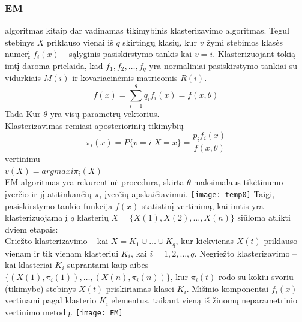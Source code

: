 \documentclass{VUMIFInfKursinis}
\begin{document}
\subsubsection{EM}
 algoritmas kitaip dar vadinamas tikimybinis klasterizavimo algoritmas.  Tegul stebinys $X$ priklauso vienai iš $q$ skirtingų klasių, kur $v$ žymi stebimos klasės numerį $f_i(x)$ – sąlyginis pasiskirstymo tankis kai $v = i$. Klasterizuojant tokią imtį daroma prielaida, kad $f_1,f_2,\ldots,f_q$ yra normaliniai pasiskirstymo tankiai su vidurkiais $M(i)$ ir kovariacinėmis matricomis $R(i)$.\\
\begin{equation}
	f(x)=\sum^q_{i=1} {q_i f_i (x) = f(x, \theta)}
\end{equation} 
Tada
Kur $\theta$ yra visų parametrų vektorius.\\
Klasterizavimas remiasi aposteriorinių tikimybių
\begin{equation}
	\pi_i (x) = P\{v = i |X = x\} = \frac{p_i f_i(x)}{f(x,\theta)}
\end{equation} 
vertinimu\\
$v(X) = argmaxi \pi_i(X)$\\
EM algoritmas yra rekurentinė procedūra, skirta $\theta$ maksimalaus tikėtinumo įverčio ir jį atitinkančių $\pi_i$ įverčių apskaičiavimui.
\texttt{[image: temp0]}
Taigi, pasiskirstymo tankio funkcija $f(x)$ statistinį vertinimą, kai imtis yra klasterizuojama į $q$ klasterių $X = \{X(1), X(2), \ldots, X(n)\}$ siūloma atlikti dviem etapais:\\
Griežto klasterizavimo – kai $X = K_1\cup  \ldots \cup K_q$, kur kiekvienas $X(t)$ priklauso vienam ir tik vienam klasteriui $K_i$, kai $i = 1, 2, \ldots, q$.
Negriežto klasterizavimo – kai klasteriai $K_i$ suprantami kaip aibės $\{(X(1), \pi_i (1)), \ldots, (X(n), \pi_i(n))\}$, kur $\pi_i(t)$ rodo su kokiu svoriu (tikimybe) stebinys $X(t)$ priskiriamas klasei $K_i$. Mišinio komponentai $f_i(x)$ vertinami pagal klasterio $K_i$ elementus, taikant vieną iš žinomų neparametrinio vertinimo metodų.
\texttt{[image: EM]}
\end{document}
